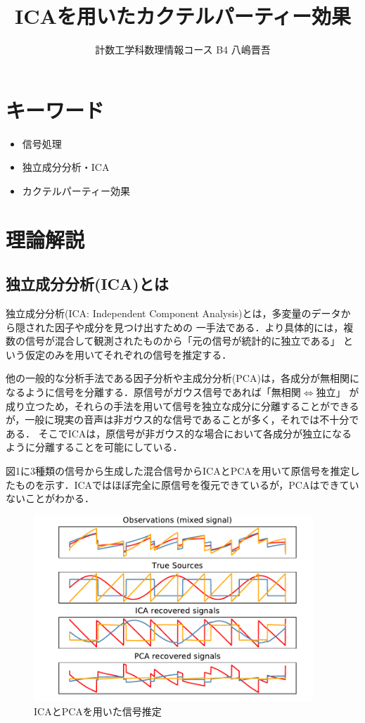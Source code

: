 \documentclass{jarticle}
\title{ICAを用いたカクテルパーティー効果}
\author{計数工学科数理情報コース B4 八嶋晋吾}
\date{}
\begin{document}
\maketitle
\section{キーワード}
\begin{itemize}
  \setlength{\parskip}{0cm}
  \setlength{\itemsep}{0cm}
  \item 信号処理
  \item 独立成分分析・ICA
  \item カクテルパーティー効果
\end{itemize}

\section{理論解説}
\subsection{独立成分分析(ICA)とは}
独立成分分析(ICA: Independent Component Analysis)とは，多変量のデータから隠された因子や成分を見つけ出すための
一手法である．より具体的には，複数の信号が混合して観測されたものから「元の信号が統計的に独立である」
という仮定のみを用いてそれぞれの信号を推定する．\par
他の一般的な分析手法である因子分析や主成分分析(PCA)は，各成分が無相関になるように信号を分離する．原信号がガウス信号であれば「無相関$\Leftrightarrow$独立」
が成り立つため，それらの手法を用いて信号を独立な成分に分離することができるが，一般に現実の音声は非ガウス的な信号であることが多く，それでは不十分である．
そこでICAは，原信号が非ガウス的な場合において各成分が独立になるように分離することを可能にしている．\par
図1に3種類の信号から生成した混合信号からICAとPCAを用いて原信号を推定したものを示す．ICAではほぼ完全に原信号を復元できているが，PCAはできていないことがわかる．
\begin{figure}[htbp]
\begin{center}
\includegraphics[clip,width=10.5cm]{./ica.pdf}
\caption{ICAとPCAを用いた信号推定}
\end{center}
\end{figure}
\end{document}
